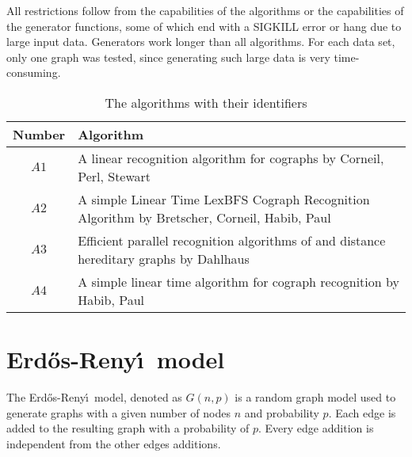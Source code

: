 All restrictions follow from the capabilities of the algorithms or the capabilities of the generator functions, some of which end with a SIGKILL error or hang due to large input data. Generators work longer than all algorithms. For each data set, only one graph was tested, since generating such large data is very time-consuming.
\begin{center}
\begin{table}[]
    \centering
    \begin{tabular}{ | c | p{10cm} |}
  \hline
  Number & Algorithm \\ [0.5ex] 
  \hline\hline
  $A1$ & A linear recognition algorithm for cographs by Corneil, Perl, Stewart \cite{corneil_perl_stewart_85} \\
  \hline
  $A2$ & A simple Linear Time LexBFS Cograph Recognition Algorithm by Bretscher, Corneil, Habib, Paul \cite{Bretscher2003ASL}\\
  \hline
  $A3$ & Efficient parallel recognition algorithms of and distance hereditary graphs by Dahlhaus \cite{dahlhaus_95}\\
  \hline
  $A4$ & A simple linear time algorithm for cograph recognition by Habib, Paul \cite{Habib2005ASL}\\
  \hline
  \end{tabular}
  \caption{The algorithms with their identifiers}
    \label{tab:algorithms_number}
\end{table}
  \end{center}

\section{Erd\H{o}s-Reny\'\i\  model}
The Erd\H{o}s-Reny\'\i\ model, denoted as $G(n,p)$ is a random graph model used to generate graphs with a given number of nodes $n$ and probability $p$. Each edge is added to the resulting graph with a probability of $p$. Every edge addition is independent from the other edges additions. 


